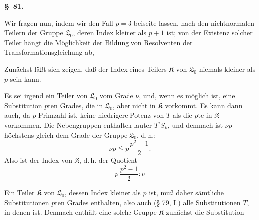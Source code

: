 \begin{center}
\textbf{\S\ 81. }
\end{center}

Wir fragen nun, indem wir den Fall $p = 3$ beiseite lassen, nach den nichtnormalen Teilern der Gruppe $\mathfrak{L}_0$, deren Index kleiner als $p+1$ ist; von der Existenz solcher Teiler hängt die Möglichkeit der Bildung von Resolventen der Transformationsgleichung ab, 

Zunächst läßt sich zeigen, daß der Index eines Teilers $\mathfrak{K}$ von $\mathfrak{L}_0$ niemals kleiner als $p$ sein kann.

Es sei
irgend ein Teiler von $\mathfrak{L}_0$ vom Grade $\nu$, und, wenn es möglich ist,
eine Substitution $p$ten Grades, die in $\mathfrak{L}_0$, aber nicht in $\mathfrak{K}$ vorkommt. Es kann dann auch, da $p$ Primzahl ist, keine niedrigere Potenz von $T$ als die $p$te in $\mathfrak{K}$ vorkommen. Die Nebengruppen
enthalten lauter  $T^i S_k$, und demnach ist $\nu p$ höchstens gleich dem Grade der Gruppe $\mathfrak{L}_0$, d.\,h.:
\[
\nu p \leqq p\,\frac{p^2-1}{2}.
\]
Also ist der Index von $\mathfrak{K}$, d.\,h. der Quotient
\[
p\,\frac{p^2-1}{2} : \nu
\]

Ein Teiler $\mathfrak{K}$ von $\mathfrak{L}_0$, dessen Index kleiner als $p$ ist, muß daher sämtliche Substitutionen $p$ten Grades enthalten, also auch (§ 79, I.) alle Substitutionen $T$, in denen
ist. Demnach enthält eine solche Gruppe $\mathfrak{K}$ zunächst die Substitution
